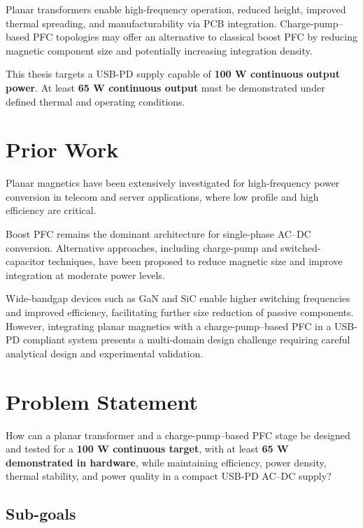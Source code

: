 \documentclass[12pt,a4paper]{report}
\begin{document}
Planar transformers enable high-frequency operation, reduced height, improved thermal spreading, and manufacturability via PCB integration. Charge-pump--based PFC topologies may offer an alternative to classical boost PFC by reducing magnetic component size and potentially increasing integration density.

This thesis targets a USB-PD supply capable of \textbf{100 W continuous output power}. At least \textbf{65 W continuous output} must be demonstrated under defined thermal and operating conditions.

\section{Prior Work}

Planar magnetics have been extensively investigated for high-frequency power conversion in telecom and server applications, where low profile and high efficiency are critical.

Boost PFC remains the dominant architecture for single-phase AC--DC conversion. Alternative approaches, including charge-pump and switched-capacitor techniques, have been proposed to reduce magnetic size and improve integration at moderate power levels.

Wide-bandgap devices such as GaN and SiC enable higher switching frequencies and improved efficiency, facilitating further size reduction of passive components. However, integrating planar magnetics with a charge-pump--based PFC in a USB-PD compliant system presents a multi-domain design challenge requiring careful analytical design and experimental validation.

\section{Problem Statement}

How can a planar transformer and a charge-pump--based PFC stage be designed and tested for a \textbf{100 W continuous target}, with at least \textbf{65 W demonstrated in hardware}, while maintaining efficiency, power density, thermal stability, and power quality in a compact USB-PD AC--DC supply?

\subsection*{Sub-goals}
\end{document}
